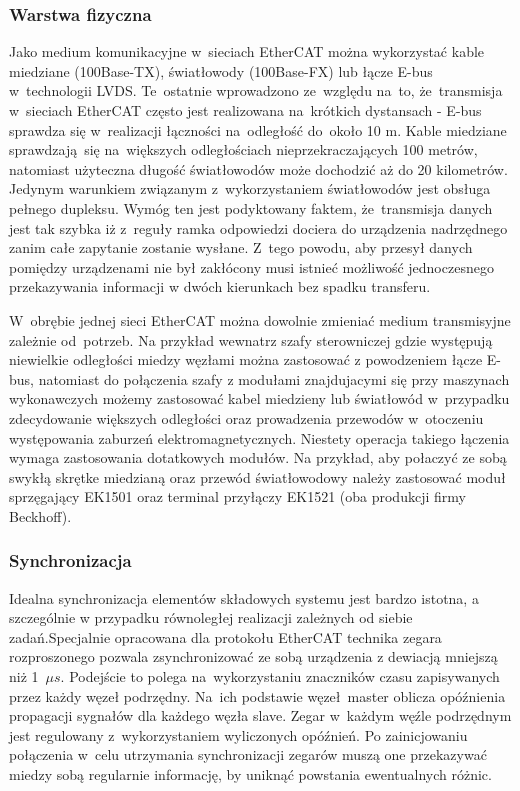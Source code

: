 \subsubsection{Warstwa fizyczna}
Jako medium komunikacyjne w~sieciach EtherCAT można wykorzystać kable miedziane (100Base-TX), światłowody (100Base-FX) lub łącze E-bus w~technologii LVDS. Te~ostatnie wprowadzono ze~względu na~to, że~transmisja w~sieciach EtherCAT często jest realizowana na~krótkich dystansach - E-bus sprawdza się w~realizacji łączności na~odległość do~około 10 m. Kable miedziane sprawdzają~się na~większych odległościach nieprzekraczających 100 metrów, natomiast użyteczna długość światłowodów może dochodzić aż do 20 kilometrów. Jedynym warunkiem związanym z~wykorzystaniem światłowodów jest obsługa pełnego dupleksu. Wymóg ten jest podyktowany faktem, że~transmisja danych jest tak szybka iż z~reguły ramka odpowiedzi dociera do urządzenia nadrzędnego zanim całe zapytanie zostanie wysłane. Z~tego powodu, aby przesył danych pomiędzy urządzenami nie był zakłócony musi istnieć możliwość jednoczesnego przekazywania informacji w dwóch kierunkach bez spadku transferu.

W~obrębie jednej sieci EtherCAT można dowolnie zmieniać medium transmisyjne zależnie od~potrzeb. Na przykład wewnatrz szafy sterowniczej gdzie występują niewielkie odległości miedzy węzłami można zastosować z powodzeniem łącze E-bus, natomiast do połączenia szafy z modułami znajdujacymi się przy maszynach wykonawczych możemy zastosować kabel miedzieny lub światłowód w~przypadku zdecydowanie większych odległości oraz prowadzenia przewodów w~otoczeniu występowania zaburzeń elektromagnetycznych. Niestety operacja takiego łączenia wymaga zastosowania dotatkowych modułów. Na przykład, aby połaczyć ze sobą swykłą skrętke miedzianą oraz przewód światłowodowy należy zastosować moduł sprzęgający EK1501 oraz terminal przyłączy EK1521 (oba produkcji firmy Beckhoff).

\subsubsection{Synchronizacja}
Idealna synchronizacja elementów składowych systemu jest bardzo istotna, a szczególnie w przypadku równoległej realizacji zależnych od siebie zadań.Specjalnie opracowana dla protokołu EtherCAT technika zegara rozproszonego pozwala zsynchronizować ze sobą urządzenia z dewiacją mniejszą niż 1~$\mu s$. Podejście to polega na~wykorzystaniu znaczników czasu zapisywanych przez każdy węzeł podrzędny. Na~ich podstawie węzeł~master oblicza opóźnienia propagacji sygnałów dla każdego węzła slave. Zegar w~każdym węźle podrzędnym jest regulowany z~wykorzystaniem wyliczonych opóźnień. Po zainicjowaniu połączenia w~celu utrzymania synchronizacji zegarów muszą one przekazywać miedzy sobą regularnie informację, by uniknąć powstania ewentualnych różnic.

